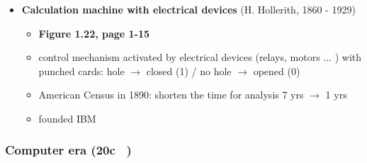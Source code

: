 \documentclass{standalone}
\begin{document}
\begin{itemize}
\begin{itemize}
		\end{itemize}
	\item \textbf{Calculation machine with electrical devices} (H. Hollerith, 1860 - 1929)
		\begin{itemize}
			\item \textbf{Figure 1.22, page 1-15}
			\item control mechanism activated by electrical devices (relays, motors ... ) with punched cards: hole $\rightarrow$ closed (1) / no hole $\rightarrow$ opened (0)
			\item American Census in 1890: shorten the time for analysis 7 yrs $\rightarrow$ 1 yrs
			\item founded IBM
		\end{itemize}
\end{itemize}

\subsubsection*{Computer era (20c ~)}
\end{document}
